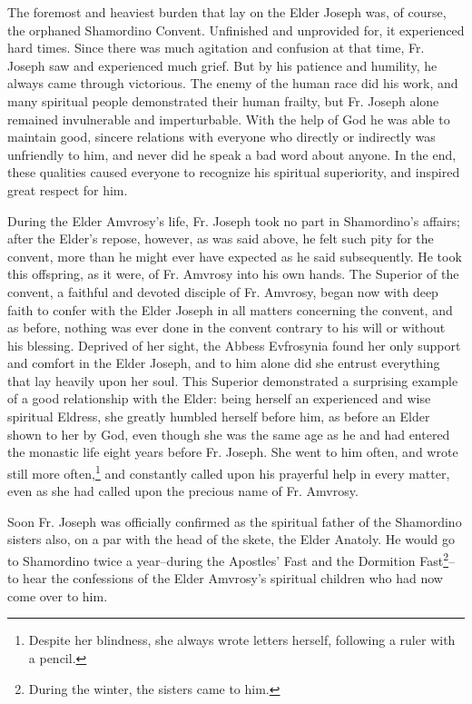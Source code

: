 The foremost and heaviest burden that lay on the Elder Joseph was, of course, the orphaned Shamordino Convent. Unfinished and unprovided for, it experienced hard times. Since there was much agitation and confusion at that time, Fr. Joseph saw and experienced much grief. But by his patience and humility, he always came through victorious. The enemy of the human race did his work, and many spiritual people demonstrated their human frailty, but Fr. Joseph alone remained invulnerable and imperturbable. With the help of God he was able to maintain good, sincere relations with everyone who directly or indirectly was unfriendly to him, and never did he speak a bad word about anyone. In the end, these qualities caused everyone to recognize his spiritual superiority, and inspired great respect for him.

During the Elder Amvrosy's life, Fr. Joseph took no part in Shamordino's affairs; after the Elder's repose, however, as was said above, he felt such pity for the convent, more than he might ever have expected as he said subsequently. He took this offspring, as it were, of Fr. Amvrosy into his own hands. The Superior of the convent, a faithful and devoted disciple of Fr. Amvrosy, began now with deep faith to confer with the Elder Joseph in all matters concerning the convent, and as before, nothing was ever done in the convent contrary to his will or without his blessing. Deprived of her sight, the Abbess Evfrosynia found her only support and comfort in the Elder Joseph, and to him alone did she entrust everything that lay heavily upon her soul. This Superior demonstrated a surprising example of a good relationship with the Elder: being herself an experienced and wise spiritual Eldress, she greatly humbled herself before him, as before an Elder shown to her by God, even though she was the same age as he and had entered the monastic life eight years before Fr. Joseph. She went to him often, and wrote still more often,\footnote{Despite her blindness, she always wrote letters herself, following a ruler with a pencil.} and constantly called upon his prayerful help in every matter, even as she had called upon the precious name of Fr. Amvrosy.

Soon Fr. Joseph was officially confirmed as the spiritual father of the Shamordino sisters also, on a par with the head of the skete, the Elder Anatoly. He would go to Shamordino twice a year--during the Apostles' Fast and the Dormition Fast\footnote{During the winter, the sisters came to him.}--to hear the confessions of the Elder Amvrosy's spiritual children who had now come over to him.

